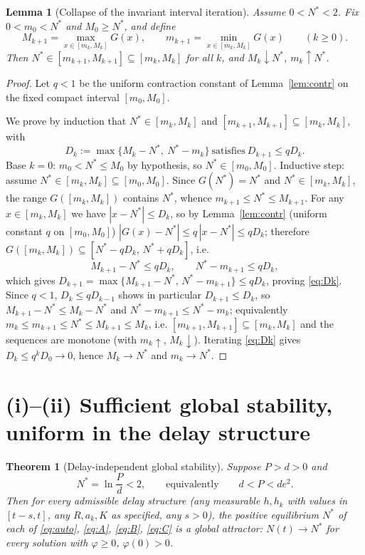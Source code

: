\documentclass[12pt]{article}
\newtheorem{theorem}{Theorem}
\newtheorem{lemma}{Lemma}
\theoremstyle{definition}
\begin{document}
\begin{lemma}[Collapse of the invariant interval iteration]\label{lem:iter}
Assume $0<N^*<2$. Fix $0<m_0<N^*$ and $M_0\ge N^*$, and define
\begin{equation}\label{eq:Mm}
  M_{k+1}=\max_{x\in[m_k,M_k]}G(x),\qquad
  m_{k+1}=\min_{x\in[m_k,M_k]}G(x)\qquad(k\ge0).
\end{equation}
Then $N^*\in[m_{k+1},M_{k+1}]\subseteq[m_k,M_k]$ for all $k$, and
$M_k\downarrow N^*$, $m_k\uparrow N^*$.
\end{lemma}

\begin{proof}
Let $q<1$ be the uniform contraction constant of Lemma~\ref{lem:contr} on the
fixed compact interval $[m_0,M_0]$.

We prove by induction that $N^*\in[m_k,M_k]$ and
$[m_{k+1},M_{k+1}]\subseteq[m_k,M_k]$, with
\begin{equation}\label{eq:Dk}
  D_k:=\max\{M_k-N^*,\ N^*-m_k\}\ \text{satisfies}\ D_{k+1}\le qD_k .
\end{equation}
Base $k=0$: $m_0<N^*\le M_0$ by hypothesis, so $N^*\in[m_0,M_0]$.
Inductive step: assume $N^*\in[m_k,M_k]\subseteq[m_0,M_0]$. Since $G(N^*)=N^*$
and $N^*\in[m_k,M_k]$, the range $G([m_k,M_k])$ contains $N^*$, whence
$m_{k+1}\le N^*\le M_{k+1}$. For any $x\in[m_k,M_k]$ we have $|x-N^*|\le D_k$,
so by Lemma~\ref{lem:contr} (uniform constant $q$ on $[m_0,M_0]$)
$|G(x)-N^*|\le q\,|x-N^*|\le qD_k$; therefore
$G([m_k,M_k])\subseteq[N^*-qD_k,\,N^*+qD_k]$, i.e.
\[
  M_{k+1}-N^*\le qD_k,\qquad N^*-m_{k+1}\le qD_k,
\]
which gives $D_{k+1}=\max\{M_{k+1}-N^*,\,N^*-m_{k+1}\}\le qD_k$, proving
\eqref{eq:Dk}. Since $q<1$, $D_k\le qD_{k-1}$ shows in particular
$D_{k+1}\le D_k$, so $M_{k+1}-N^*\le M_k-N^*$ and $N^*-m_{k+1}\le N^*-m_k$;
equivalently $m_k\le m_{k+1}\le N^*\le M_{k+1}\le M_k$, i.e.
$[m_{k+1},M_{k+1}]\subseteq[m_k,M_k]$ and the sequences are monotone (with
$m_k\uparrow$, $M_k\downarrow$). Iterating \eqref{eq:Dk} gives
$D_k\le q^kD_0\to0$, hence $M_k\to N^*$ and $m_k\to N^*$.
\end{proof}

\section{(i)--(ii) Sufficient global stability, uniform in the delay structure}

\begin{theorem}[Delay-independent global stability]\label{thm:main}
Suppose $P>d>0$ and
\begin{equation}\label{eq:cond}
  N^*=\ln\frac{P}{d}<2,\qquad\text{equivalently}\qquad d<P<de^{2}.
\end{equation}
Then for every admissible delay structure (any measurable $h,h_k$ with values
in $[t-s,t]$, any $R,a_k,K$ as specified, any $s>0$), the positive equilibrium
$N^*$ of each of \eqref{eq:auto}, \eqref{eq:A}, \eqref{eq:B}, \eqref{eq:C} is a
global attractor: $N(t)\to N^*$ for every solution with $\varphi\ge0$,
$\varphi(0)>0$.
\end{theorem}
\end{document}
